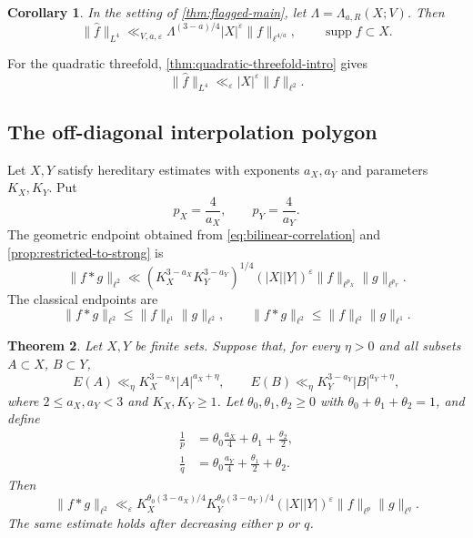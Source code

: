 \documentclass[11pt]{amsart}
\numberwithin{equation}{section}
\newtheorem{theorem}{Theorem}[section]
\newtheorem{corollary}[theorem]{Corollary}
\theoremstyle{definition}
\theoremstyle{remark}
\newcommand{\supp}{\operatorname{supp}}
\newcommand{\eps}{\varepsilon}
\newcommand{\1}{\mathbf 1}
\newcommand{\card}[1]{\lvert #1\rvert}
\newcommand{\norm}[2][]{\lVert #2\rVert_{#1}}
\begin{document}
\begin{corollary}\label{cor:weighted-flag}
In the setting of \cref{thm:flagged-main}, let $\Lambda=\Lambda_{a,R}(X;V)$.  Then
\begin{equation}\label{eq:weighted-flag}
 \norm[L^4]{\widehat f}
 \ll_{V,a,\eps}
 \Lambda^{(3-a)/4}\card X^\eps
 \norm[\ell^{4/a}]{f},
 \qquad \supp f\subset X.
\end{equation}
\end{corollary}

For the quadratic threefold, \cref{thm:quadratic-threefold-intro} gives
\begin{equation}\label{eq:weighted-threefold}
 \norm[L^4]{\widehat f}
 \ll_\eps\card X^\eps\norm[\ell^2]{f}.
\end{equation}

\subsection{The off-diagonal interpolation polygon}
Let $X,Y$ satisfy hereditary estimates with exponents $a_X,a_Y$ and parameters $K_X,K_Y$.  Put
\[
 p_X=\frac4{a_X},
 \qquad
 p_Y=\frac4{a_Y}.
\]
The geometric endpoint obtained from \eqref{eq:bilinear-correlation} and \cref{prop:restricted-to-strong} is
\begin{equation}\label{eq:geometric-bilinear-endpoint}
 \norm[\ell^2]{f*g}
 \ll (K_X^{3-a_X}K_Y^{3-a_Y})^{1/4}
 (\card X\card Y)^\eps
 \norm[\ell^{p_X}]{f}\norm[\ell^{p_Y}]{g}.
\end{equation}
The classical endpoints are
\begin{equation}\label{eq:classical-bilinear-endpoints}
 \norm[\ell^2]{f*g}\leq\norm[\ell^1]{f}\norm[\ell^2]{g},
 \qquad
 \norm[\ell^2]{f*g}\leq\norm[\ell^2]{f}\norm[\ell^1]{g}.
\end{equation}

\begin{theorem}\label{thm:general-offdiag}
Let $X,Y$ be finite sets.  Suppose that, for every $\eta>0$ and all subsets $A\subset X$, $B\subset Y$,
\[
 E(A)\ll_\eta K_X^{3-a_X}\card A^{a_X+\eta},
 \qquad
 E(B)\ll_\eta K_Y^{3-a_Y}\card B^{a_Y+\eta},
\]
where $2\leq a_X,a_Y<3$ and $K_X,K_Y\geq1$.  Let $\theta_0,\theta_1,\theta_2\geq0$ with $\theta_0+\theta_1+\theta_2=1$, and define
\begin{align}
 \frac1p&=\theta_0\frac{a_X}{4}+\theta_1+\frac{\theta_2}{2},\label{eq:p-barycentric}\\
 \frac1q&=\theta_0\frac{a_Y}{4}+\frac{\theta_1}{2}+\theta_2.\label{eq:q-barycentric}
\end{align}
Then
\begin{equation}\label{eq:general-offdiag}
 \norm[\ell^2]{f*g}
 \ll_\eps
 K_X^{\theta_0(3-a_X)/4}
 K_Y^{\theta_0(3-a_Y)/4}
 (\card X\card Y)^\eps
 \norm[\ell^p]{f}\norm[\ell^q]{g}.
\end{equation}
The same estimate holds after decreasing either $p$ or $q$.
\end{theorem}
\end{document}
